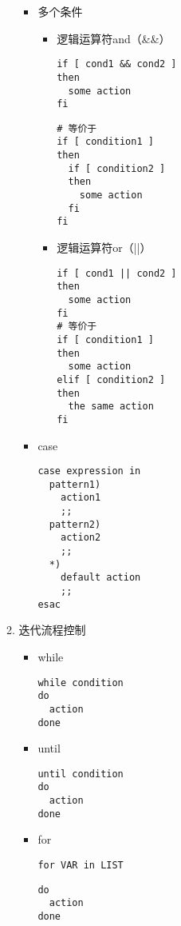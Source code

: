 \documentclass{TIJMUjiaoanLL}
\begin{document}
\begin{enumerate}
\begin{enumerate}
\begin{itemize}
          \item 多个条件
	      \begin{itemize}
		\item 逻辑运算符and（\&\&）
\begin{verbatim}
if [ cond1 && cond2 ]
then
  some action
fi
\end{verbatim}
\vspace*{-10pt}
\begin{figure}[h]
\end{figure}
\vspace*{-10pt}
\begin{verbatim}
# 等价于
if [ condition1 ]
then
  if [ condition2 ]
  then
    some action
  fi
fi
\end{verbatim}


\otherTail
\newpage
\otherHeader


		\item 逻辑运算符or（||）
\begin{verbatim}
if [ cond1 || cond2 ]
then
  some action
fi
# 等价于
if [ condition1 ]
then
  some action
elif [ condition2 ]
then
  the same action
fi
\end{verbatim}
	      \end{itemize}

	  \item case
\begin{verbatim}
case expression in
  pattern1)
    action1
    ;;
  pattern2)
    action2
    ;;
  *)
    default action
    ;;
esac
\end{verbatim}

	\end{itemize}

      \item 迭代流程控制
	\begin{itemize}
	  \item while
\begin{verbatim}
while condition
do
  action
done
\end{verbatim}

	  \item until
\begin{verbatim}
until condition
do
  action
done
\end{verbatim}
	  \item for
\begin{verbatim}
for VAR in LIST
\end{verbatim}
\begin{verbatim}
do
  action
done
\end{verbatim}
	\end{itemize}
    \end{enumerate}


\end{enumerate}
\end{document}
